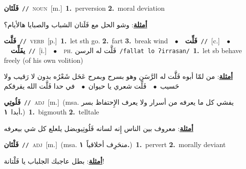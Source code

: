 \documentclass[10pt,a4paper,twoside]{article} %
\begin{document}
\begin{multicols}{2}
{\setlength\topsep{0pt}\textbf{\foreignlanguage{arabic}{فَلَتَان}}\ {\color{gray}\texttt{//}\color{black}}\ \textsc{noun}\ [m.]\ \textbf{1.}~perversion  \textbf{2.}~moral deviation\  \begin{flushright}\color{gray}\foreignlanguage{arabic}{\textbf{\underline{\foreignlanguage{arabic}{أمثلة}}}: وشو الحل مع فَلَتان الشباب والصبايا هالأيام؟}\end{flushright}\color{black}} \vspace{2mm}

{\setlength\topsep{0pt}\textbf{\foreignlanguage{arabic}{فَلَّت}}\ {\color{gray}\texttt{//}\color{black}}\ \textsc{verb}\ [p.]\ \textbf{1.}~let sth go.  \textbf{2.}~fart  \textbf{3.}~break wind\ \ $\bullet$\ \ \setlength\topsep{0pt}\textbf{\foreignlanguage{arabic}{فَلِّت}}\ {\color{gray}\texttt{//}\color{black}}\ [c.]\ \ $\bullet$\ \ \setlength\topsep{0pt}\textbf{\foreignlanguage{arabic}{يفَلِّت}}\ {\color{gray}\texttt{//}\color{black}}\ [i.]\ \ $\bullet$\ \ \textsc{ph.} \color{gray} \foreignlanguage{arabic}{فَلَّت له الرسن}\color{black}\ {\color{gray}\texttt{/{\sffamily fallat lo ʔirrasan}/}\color{black}}\ \textbf{1.}~let sb behave freely (of his own volition)\  \begin{flushright}\color{gray}\foreignlanguage{arabic}{\textbf{\underline{\foreignlanguage{arabic}{أمثلة}}}: من لمّا أبوه فَلََّت له الرَّسَن وهو بسرح وبمرح عَحَل شَعْرُه بدون لا رَقيب ولا حَسيب\ $\bullet$\ \  فَلِّت شعري يا حيوان\ $\bullet$\ \  في حدا فَلَّت الله يقرفكم}\end{flushright}\color{black}} \vspace{2mm}

{\setlength\topsep{0pt}\textbf{\foreignlanguage{arabic}{فَلُوتِي}}\ {\color{gray}\texttt{//}\color{black}}\ \textsc{adj}\ [m.]\ \color{gray}(msa. \foreignlanguage{arabic}{يفشي كل ما يعرفه من أسرار ولا يعرف الإِحتفاظ بسر أبدا}~\foreignlanguage{arabic}{\textbf{١.}})\color{black}\ \textbf{1.}~bigmouth  \textbf{2.}~telltale\  \begin{flushright}\color{gray}\foreignlanguage{arabic}{\textbf{\underline{\foreignlanguage{arabic}{أمثلة}}}: معروف بين الناس إِنه لسانه فَلُوتِيوبضل يلعلع كل شي بيعرفه}\end{flushright}\color{black}} \vspace{2mm}

{\setlength\topsep{0pt}\textbf{\foreignlanguage{arabic}{فَلْتَان}}\ {\color{gray}\texttt{//}\color{black}}\ \textsc{adj}\ [m.]\ \color{gray}(msa. \foreignlanguage{arabic}{منحَرِف أخلاقياً}~\foreignlanguage{arabic}{\textbf{١.}})\color{black}\ \textbf{1.}~pervert  \textbf{2.}~morally deviant\  \begin{flushright}\color{gray}\foreignlanguage{arabic}{\textbf{\underline{\foreignlanguage{arabic}{أمثلة}}}: بطل عاجبك الجلباب يا فَلْتانة!}\end{flushright}\color{black}} \vspace{2mm}


\end{multicols}
\end{document}
